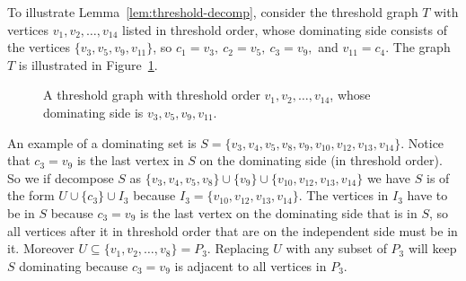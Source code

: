 \documentclass[11pt]{amsart}
\numberwithin{equation}{section}
\begin{document}

To illustrate Lemma~\ref{lem:threshold-decomp}, consider the threshold graph $T$ with vertices $v_1,v_2,\ldots,v_{14}$ listed in threshold order, whose dominating side consists of the vertices $\{v_3,v_5,v_9,v_{11}\}$, so $c_1=v_3, \ c_2=v_5, \ c_3=v_9,$ and $v_{11}=c_4$. The graph $T$ is illustrated in Figure~\ref{fig:four-prefix-joins}.

\begin{figure}[h]
\centering
{}
\caption{A threshold graph with threshold order $v_1,v_2,\ldots,v_{14}$, whose dominating side is $v_3,v_5,v_9,v_{11}$.}
\label{fig:four-prefix-joins}
\end{figure}

An example of a dominating set is $S=\{v_3,v_4,v_5,v_8,v_9,v_{10},v_{12},v_{13},v_{14}\}$. Notice that $c_3=v_9$ is the last vertex in $S$ on the dominating side (in threshold order). So we if decompose $S$ as $\{v_3,v_4,v_5,v_8\} \cup \{v_9\} \cup \{v_{10},v_{12},v_{13},v_{14}\}$ we have $S$ is of the form $U \cup \{c_3\} \cup I_3$ because $I_3=\{v_{10},v_{12},v_{13},v_{14}\}$. The vertices in $I_3$ have to be in $S$ because $c_3=v_9$ is the last vertex on the dominating side that is in $S$, so all vertices after it in threshold order that are on the independent side must be in it. Moreover $U \subseteq \{v_1,v_2,\ldots,v_8\} = P_3$. Replacing $U$ with any subset of $P_3$ will keep $S$ dominating because $c_3=v_9$ is adjacent to all vertices in $P_3$.
\end{document}
